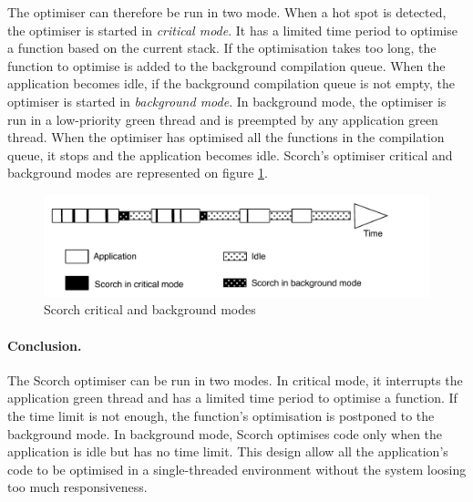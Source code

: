 \documentclass[a4paper,12pt,twoside]{../includes/ThesisStyle}
\begin{document}
The optimiser can therefore be run in two mode. When a hot spot is detected, the optimiser is started in \emph{critical mode}. It has a limited time period to optimise a function based on the current stack. If the optimisation takes too long, the function to optimise is added to the background compilation queue. When the application becomes idle, if the background compilation queue is not empty, the optimiser is started in \emph{background mode}. In background mode, the optimiser is run in a low-priority green thread and is preempted by any application green thread. When the optimiser has optimised all the functions in the compilation queue, it stops and the application becomes idle. Scorch's optimiser critical and background modes are represented on figure \ref{fig:ScorchModes}.

\begin{figure}[h!]
    \begin{center}
        \includegraphics[width=0.95\linewidth]{ScorchModes}
        \caption{Scorch critical and background modes}
        \label{fig:ScorchModes}
    \end{center}
\end{figure}


\paragraph{Conclusion.}The Scorch optimiser can be run in two modes. In critical mode, it interrupts the application green thread and has a limited time period to optimise a function. If the time limit is not enough, the function's optimisation is postponed to the background mode. In background mode, Scorch optimises code only when the application is idle but has no time limit. This design allow all the application's code to be optimised in a single-threaded environment without the system loosing too much responsiveness.
\end{document}
